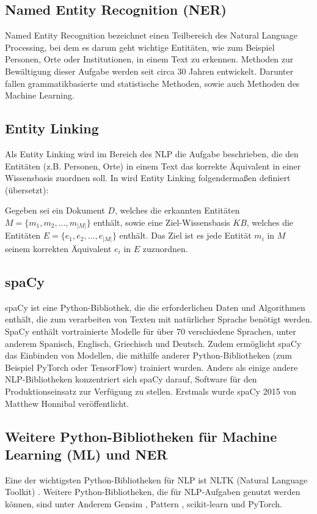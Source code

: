 \subsection{Named Entity Recognition (NER)}
Named Entity Recognition bezeichnet einen Teilbereich des Natural Language Processing, bei dem es darum geht 
wichtige Entitäten, wie zum Beispiel Personen, Orte oder Institutionen, in einem Text zu erkennen. Methoden 
zur Bewältigung dieser Aufgabe werden seit circa 30 Jahren entwickelt. Darunter fallen grammatikbasierte und 
statistische Methoden, sowie auch Methoden des Machine Learning.

\subsection{Entity Linking}
Als Entity Linking wird im Bereich des NLP die Aufgabe beschrieben, die den Entitäten (z.B. Personen, Orte) 
in einem Text das korrekte Äquivalent in einer Wissensbasis zuordnen soll.
In \cite{shen_entity_2021} wird Entity Linking folgendermaßen definiert (übersetzt):
\begin{defn}
Gegeben sei ein Dokument $D$, welches die erkannten Entitäten $M=\{m_1, m_2, \dots, m_{|M|}\}$ enthält, sowie
eine Ziel-Wissensbasis $KB$, welches die Entitäten $E=\{e_1, e_2, \dots, e_{|M|}\}$ enthält. Das Ziel ist es 
jede Entität $m_i$ in $M$ seinem korrekten Äquivalent $e_i$ in $E$ zuzuordnen.
\end{defn}

\subsection{spaCy}
spaCy ist eine Python-Bibliothek, die die erforderlichen Daten und Algorithmen enthält, die zum verarbeiten von
Texten mit natürlicher Sprache benötigt werden. SpaCy enthält vortrainierte Modelle für über 70 verschiedene 
Sprachen, unter anderem Spanisch, Englisch, Griechisch und Deutsch. Zudem ermöglicht spaCy das Einbinden von 
Modellen, die mithilfe anderer Python-Bibliotheken (zum Beispiel PyTorch oder TensorFlow) trainiert wurden.
Anders als einige andere NLP-Bibliotheken konzentriert sich spaCy darauf, Software für den Produktionseinsatz 
zur Verfügung zu stellen. Erstmals wurde spaCy 2015 von Matthew Honnibal veröffentlicht. 
\cite{vasiliev2020natural} \cite{github_spacy} \cite{spacy}

\subsection{Weitere Python-Bibliotheken für Machine Learning (ML) und NER}
Eine der wichtigsten Python-Bibliotheken für NLP ist NLTK (Natural Language Toolkit) \cite{bird2006nltk}.
Weitere Python-Bibliotheken, die für NLP-Aufgaben genutzt werden können, sind unter Anderem
Gensim \cite{vrehuuvrek2011gensim}, Pattern \cite{de2012pattern}\cite{github_pattern}, 
scikit-learn und PyTorch.

